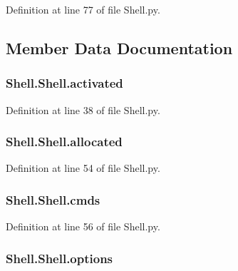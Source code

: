 Definition at line 77 of file Shell.\-py.



\subsection{Member Data Documentation}
\hypertarget{classShell_1_1Shell_a5869d648354d59617e4a9836ef0c4ba3}{
\subsubsection[{activated}]{\setlength{\rightskip}{0pt plus 5cm}Shell.\-Shell.\-activated}}\label{classShell_1_1Shell_a5869d648354d59617e4a9836ef0c4ba3}


Definition at line 38 of file Shell.\-py.

\hypertarget{classShell_1_1Shell_a7d3526fa682799bd7be51fa09c2c9017}{
\subsubsection[{allocated}]{\setlength{\rightskip}{0pt plus 5cm}Shell.\-Shell.\-allocated}}\label{classShell_1_1Shell_a7d3526fa682799bd7be51fa09c2c9017}


Definition at line 54 of file Shell.\-py.

\hypertarget{classShell_1_1Shell_abe2dca7284b995f29494ae5e2ea975a7}{
\subsubsection[{cmds}]{\setlength{\rightskip}{0pt plus 5cm}Shell.\-Shell.\-cmds}}\label{classShell_1_1Shell_abe2dca7284b995f29494ae5e2ea975a7}


Definition at line 56 of file Shell.\-py.

\hypertarget{classShell_1_1Shell_a3e2a9754ac3fa0e2a00c5f0861ef85f2}{
\subsubsection[{options}]{\setlength{\rightskip}{0pt plus 5cm}Shell.\-Shell.\-options}}\label{classShell_1_1Shell_a3e2a9754ac3fa0e2a00c5f0861ef85f2}


